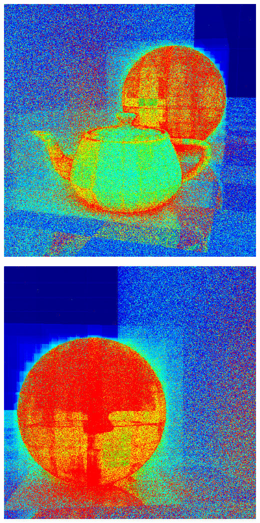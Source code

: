 \begin{center}
\begin{minipage}{0.48\linewidth}
\includegraphics[width=\linewidth]{img/teapot-perf.png}
\end{minipage}
\begin{minipage}{0.48\linewidth}
\includegraphics[width=\linewidth]{img/sphere-perf.png}
\end{minipage}
\end{center}
